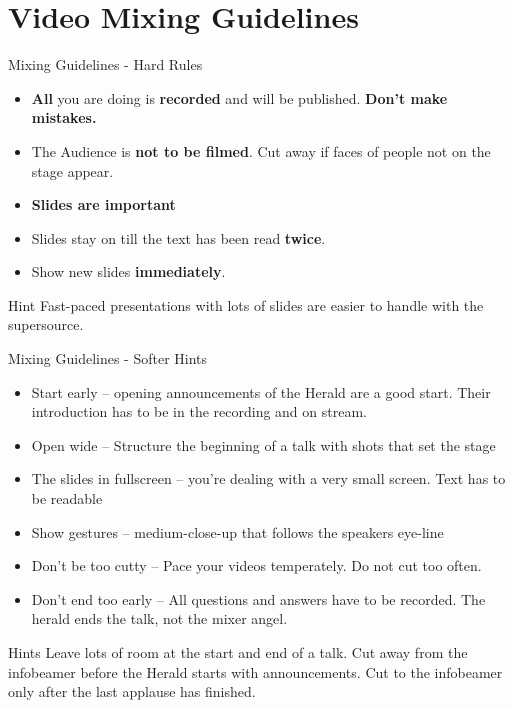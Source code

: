 \documentclass[aspectratio=169]{beamer}
\begin{document}
\section{Video Mixing Guidelines}
\begin{frame}{Mixing Guidelines - Hard Rules}
	\begin{itemize}
		\item \textbf{All} you are doing is \textbf{recorded} and will be published. \alert{\textbf{Don't make mistakes.}}
		\item The Audience is \textbf{not to be filmed}. Cut away if faces of people not on the stage appear.
		\item \textbf{Slides are important}
		\item Slides stay on till the text has been read \textbf{twice}.
		\item Show new slides \textbf{immediately}.
	\end{itemize}
	\begin{exampleblock}{Hint}
		Fast-paced presentations with lots of slides are easier to handle with the supersource.
	\end{exampleblock}
\end{frame}


\begin{frame}{Mixing Guidelines - Softer Hints}
	\begin{itemize}
		\item Start early – opening announcements of the Herald are a good start. Their introduction has to be in the recording and on stream.
		\item Open wide – Structure the beginning of a talk with shots that set the stage
		\item The slides in fullscreen – you’re dealing with a very small screen. Text has to be readable
		\item Show gestures – medium-close-up that follows the speakers eye-line
		\item Don’t be too cutty – Pace your videos temperately. Do not cut too often.
		\item Don't end too early – All questions and answers have to be recorded. The herald ends the talk, not the mixer angel.
	\end{itemize}
	\begin{exampleblock}{Hints}
		Leave lots of room at the start and end of a talk. 
		Cut away from the infobeamer before the Herald starts with announcements. 
		Cut to the infobeamer only after the last applause has finished.
	\end{exampleblock}
\end{frame}
\end{document}
